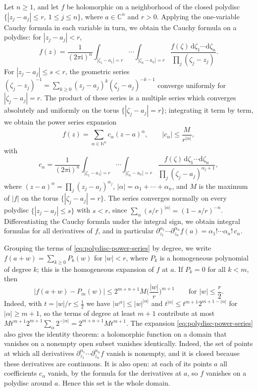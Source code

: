Let $n\geq1$, and let $f$ be holomorphic on a neighborhood of the closed polydisc $\{|z_j-a_j|\leq r,\ 1\leq j\leq n\}$, where $a\in\mathbb C^n$ and $r>0$. Applying the one-variable Cauchy formula in each variable in turn, we obtain the Cauchy formula on a polydisc: for $|z_j-a_j|<r$,
\[
 f(z)=\frac{1}{(2\pi\mathrm{i})^n}
 \int_{|\zeta_1-a_1|=r}\cdots\int_{|\zeta_n-a_n|=r}
 \frac{f(\zeta)\,\mathrm{d}\zeta_1\cdots\mathrm{d}\zeta_n}
 {\prod_j(\zeta_j-z_j)}.
\]
For $|z_j-a_j|\leq s<r$, the geometric series $(\zeta_j-z_j)^{-1}=\sum_{k\geq0}(z_j-a_j)^k(\zeta_j-a_j)^{-k-1}$ converge uniformly for $|\zeta_j-a_j|=r$. The product of these series is a multiple series which converges absolutely and uniformly on the torus $\{|\zeta_j-a_j|=r\}$; integrating it term by term, we obtain the power series expansion
\begin{equation}\label{eq:polydisc-power-series}
 f(z)=\sum_{\alpha\in\mathbb N^n}c_\alpha(z-a)^\alpha,\qquad
 |c_\alpha|\leq\frac{M}{r^{|\alpha|}},
\end{equation}
with
\[
 c_\alpha=\frac{1}{(2\pi\mathrm{i})^n}\int_{|\zeta_1-a_1|=r}\cdots\int_{|\zeta_n-a_n|=r}\frac{f(\zeta)\,\mathrm d\zeta_1\cdots\mathrm d\zeta_n}{\prod_j(\zeta_j-a_j)^{\alpha_j+1}},
\]
where $(z-a)^\alpha=\prod_j(z_j-a_j)^{\alpha_j}$, $|\alpha|=\alpha_1+\cdots+\alpha_n$, and $M$ is the maximum of $|f|$ on the torus $\{|\zeta_j-a_j|=r\}$. The series converges normally on every polydisc $\{|z_j-a_j|\leq s\}$ with $s<r$, since $\sum_\alpha(s/r)^{|\alpha|}=(1-s/r)^{-n}$. Differentiating the Cauchy formula under the integral sign, we obtain integral formulas for all derivatives of $f$, and in particular $\partial_{z_1}^{\alpha_1}\cdots\partial_{z_n}^{\alpha_n}f(a)=\alpha_1!\cdots\alpha_n!\,c_\alpha$.

Grouping the terms of \eqref{eq:polydisc-power-series} by degree, we write $f(a+w)=\sum_{k\geq0}P_k(w)$ for $|w|<r$, where $P_k$ is a homogeneous polynomial of degree $k$; this is the homogeneous expansion of $f$ at $a$. If $P_k=0$ for all $k<m$, then
\begin{equation}\label{eq:homogeneous-expansion-remainder}
 |f(a+w)-P_m(w)|\leq2^{m+n+1}M\Big(\frac{|w|}r\Big)^{m+1}\qquad\text{for }|w|\leq\frac r2.
\end{equation}
Indeed, with $t=|w|/r\leq\frac12$ we have $|w^\alpha|\leq|w|^{|\alpha|}$ and $t^{|\alpha|}\leq t^{m+1}2^{m+1-|\alpha|}$ for $|\alpha|\geq m+1$, so the terms of degree at least $m+1$ contribute at most $Mt^{m+1}2^{m+1}\sum_\alpha2^{-|\alpha|}=2^{m+n+1}Mt^{m+1}$. The expansion \eqref{eq:polydisc-power-series} also gives the identity theorem: a holomorphic function on a domain that vanishes on a nonempty open subset vanishes identically. Indeed, the set of points at which all derivatives $\partial_{z_1}^{\alpha_1}\cdots\partial_{z_n}^{\alpha_n}f$ vanish is nonempty, and it is closed because these derivatives are continuous. It is also open: at each of its points $a$ all coefficients $c_\alpha$ vanish, by the formula for the derivatives at $a$, so $f$ vanishes on a polydisc around $a$. Hence this set is the whole domain.

